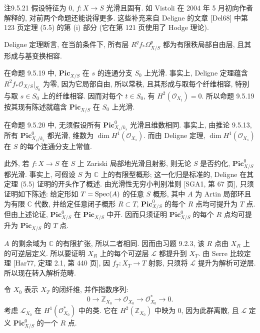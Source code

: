 \begin{origstatement}{注}{9.5.21}\label{ch09s05:rem9.5.21}
假设特征为 $0$, $f:X\to S$ 光滑且固有. 如 Vistoli 在 2004 年 5 月初向作者解释的, 对前两个命题还能说得更多. 这些补充来自 Deligne 的文章 [Del68] 中第 123 页定理 (5.5) 的第 (i) 部分 (它在第 121 页使用了 Hodge 理论).


Deligne 定理断言, 在当前条件下, 所有层 $R^qf_*\Omega^p_{X/S}$ 都为有限秩局部自由层, 且其形成与基变换相容.

在命题 9.5.19 中, $\mathbf{Pic}_{X/S}$ 在 $s$ 的连通分支 $S_0$ 上光滑. 事实上, Deligne 定理蕴含 $R^2f_*\mathcal O_{X/S}|_{S_0}$ 为零, 因为它局部自由, 所以常秩, 且其形成与取每个纤维相容, 特别与取 $s\in S_0$ 上的纤维相容. 因而对每个 $t\in S_0$, 有 $H^2(\mathcal O_{X_t})=0$. 所以命题 9.5.19 按其现有陈述就蕴含 $\mathbf{Pic}_{X/S}$ 在 $S_0$ 上光滑.

在命题 9.5.20 中, 无须假设所有 $\mathbf{Pic}^0_{X_s/k_s}$ 光滑且维数相同. 事实上, 由推论 9.5.13, 所有 $\mathbf{Pic}^0_{X_s/k_s}$ 都光滑, 维数为 $\dim H^1(\mathcal O_{X_s})$. 而由 Deligne 定理, $\dim H^1(\mathcal O_{X_s})$ 在 $S$ 的每个连通分支上常值.

此外, 若 $f:X\to S$ 在 $S$ 上 Zariski 局部地光滑且射影, 则无论 $S$ 是否约化, $\mathbf{Pic}^0_{X/S}$ 都光滑. 事实上, 可假设 $S$ 为 $\mathbb C$ 上的有限型概形; 这一化归是标准的, Deligne 在其定理 (5.5) 证明的开头作了概述. 由光滑性无穷小判别准则 [SGA1, 第 67 页], 只须证明如下陈述: 给定形如 $T=\operatorname{Spec}(A)$ 的任意 $S$ 概形, 其中 $A$ 为 Artin 局部环且为有限 $\mathbb C$ 代数, 并给定任意闭子概形 $R\subset T$, $\mathbf{Pic}^0_{X/S}$ 的每个 $R$ 点均可提升为 $T$ 点. 但由上述论证, $\mathbf{Pic}^0_{X/S}$ 在 $\mathbf{Pic}_{X/S}$ 中开. 因而只须证明 $\mathbf{Pic}^0_{X/S}$ 的每个 $R$ 点均可提升为 $\mathbf{Pic}_{X/S}$ 的 $T$ 点.

$A$ 的剩余域为 $\mathbb C$ 的有限扩张, 所以二者相同. 因而由习题 9.2.3, 该 $R$ 点由 $X_R$ 上的可逆层定义. 所以要证明 $X_R$ 上的每个可逆层 $\mathcal L$ 都提升到 $X_T$. 由 Serre 比较定理 [Har77, 定理 2.1, 第 440 页], 因 $f_T:X_T\to T$ 射影, 只须将 $\mathcal L$ 提升为解析可逆层. 所以现在转入解析范畴.

令 $X_0$ 表示 $X_T$ 的闭纤维, 并作指数序列:
\[
 0\longrightarrow\mathbb Z_{X_0}\longrightarrow\mathcal O_{X_0}
 \longrightarrow\mathcal O_{X_0}^*\longrightarrow0.
\]
考虑 $\mathcal L_{X_0}$ 在 $H^1(\mathcal O_{X_0}^*)$ 中的类. 它在 $H^2(\mathbb Z_{X_0})$ 中映为 $0$, 因为此群离散, 且 $\mathcal L$ 定义 $\mathbf{Pic}^0_{X/S}$ 的一个 $R$ 点.


\end{origstatement}
